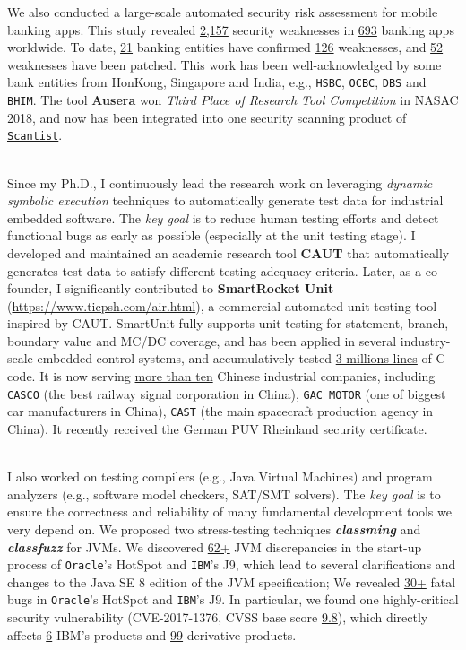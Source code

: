 \documentclass[margin]{res}
\begin{document}
\begin{resume}
We also conducted a large-scale automated security risk assessment for mobile banking apps. This study revealed \underline{2,157} security weaknesses in \underline{693} banking apps worldwide. To date, \underline{21} banking entities have confirmed \underline{126} weaknesses, and \underline{52} weaknesses have been patched. This work has been well-acknowledged by some bank entities from HonKong, Singapore and India, e.g., \texttt{HSBC}, \texttt{OCBC}, \texttt{DBS} and \texttt{BHIM}. The tool \textbf{Ausera} won \emph{Third Place of Research Tool Competition} in NASAC 2018, and now has been integrated into one security scanning product of \href{https://scantist.com/}{\texttt{Scantist}}. 

\\
Since my Ph.D., I continuously lead the research work on leveraging \emph{dynamic symbolic execution} techniques to automatically generate test data for industrial embedded software. The \emph{key goal} is to reduce human testing efforts and detect functional bugs as early as possible (especially at the unit testing stage).
I developed and maintained an academic research tool \textbf{CAUT} that automatically generates test data to satisfy different testing adequacy criteria. Later, as a co-founder, I significantly contributed to \textbf{SmartRocket Unit} (\url{https://www.ticpsh.com/air.html}), a commercial automated unit testing tool inspired by CAUT. SmartUnit fully supports unit testing for statement, branch, boundary value and MC/DC coverage, and has been applied in several industry-scale embedded control systems, and accumulatively tested \underline{3 millions lines} of C code.  
It is now serving \underline{more than ten} Chinese industrial companies, including \texttt{CASCO} (the best railway signal
corporation in China), \texttt{GAC MOTOR} (one of biggest car manufacturers in China), \texttt{CAST} (the main spacecraft production agency in China). It recently received the German PUV Rheinland security certificate.

\\
I also worked on testing compilers (e.g., Java Virtual Machines) and program analyzers (e.g., software model checkers, SAT/SMT solvers). The \emph{key goal} is to ensure the correctness and reliability of many fundamental development tools we very depend on.
We proposed two stress-testing techniques \emph{\textbf{classming}} and \emph{\textbf{classfuzz}} for JVMs. We discovered \underline{62+} JVM discrepancies in the start-up process of \texttt{Oracle}'s HotSpot and \texttt{IBM}'s J9, which lead to  several clarifications and changes to the Java SE 8 edition of the JVM specification; We revealed \underline{30+} fatal bugs in \texttt{Oracle}'s HotSpot and \texttt{IBM}'s J9. In particular, we found one highly-critical security vulnerability (CVE-2017-1376, CVSS base score \underline{9.8}), which directly affects \underline{6} IBM's products and \underline{99} derivative products.


\end{resume}
\end{document}
